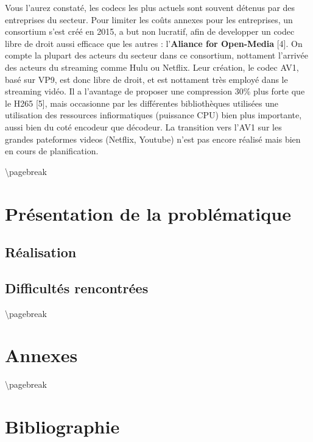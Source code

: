 \documentclass[
  french,
]{article}
\begin{document}
Vous l'aurez constaté, les codecs les plus actuels sont souvent détenus
par des entreprises du secteur. Pour limiter les coûts annexes pour les
entreprises, un consortium s'est créé en 2015, a but non lucratif, afin
de developper un codec libre de droit aussi efficace que les autres :
l'\textbf{Aliance for Open-Media} {[}4{]}. On compte la plupart des
acteurs du secteur dans ce consortium, nottament l'arrivée des acteurs
du streaming comme Hulu ou Netflix. Leur création, le codec AV1, basé
sur VP9, est donc libre de droit, et est nottament très employé dans le
streaming vidéo. Il a l'avantage de proposer une compression 30\% plus
forte que le H265 {[}5{]}, mais occasionne par les différentes
bibliothèques utilisées une utilisation des ressources infiormatiques
(puissance CPU) bien plus importante, aussi bien du coté encodeur que
décodeur. La transition vers l'AV1 sur les grandes pateformes videos
(Netflix, Youtube) n'est pas encore réalisé mais bien en cours de
planification.

\textbackslash pagebreak

\hypertarget{header-n34}{%
\section{\texorpdfstring{Présentation de la problématique
}{Présentation de la problématique }}\label{header-n34}}

\hypertarget{header-n37}{%
\subsection{\texorpdfstring{Réalisation
}{Réalisation }}\label{header-n37}}

\hypertarget{header-n38}{%
\subsection{\texorpdfstring{Difficultés rencontrées
}{Difficultés rencontrées }}\label{header-n38}}

\textbackslash pagebreak

\hypertarget{header-n41}{%
\section{Annexes}\label{header-n41}}

\textbackslash pagebreak

\hypertarget{header-n43}{%
\section{Bibliographie}\label{header-n43}}
\end{document}
